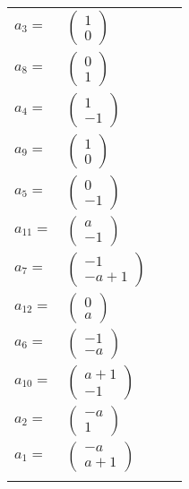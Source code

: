 \documentclass[1p]{elsarticle_modified}
\theoremstyle{definition}
\begin{document}
\begin{tabular}{m{7pt} m{180pt} m{7pt} m{180pt} }
\flushright $a_{3}=$&$\begin{pmatrix}1\\0\end{pmatrix}$ \\
\flushright $a_{8}=$&$\begin{pmatrix}0\\1\end{pmatrix}$ \\
\flushright $a_{4}=$&$\begin{pmatrix}1\\-1\end{pmatrix}$ \\
\flushright $a_{9}=$&$\begin{pmatrix}1\\0\end{pmatrix}$ \\
\flushright $a_{5}=$&$\begin{pmatrix}0\\-1\end{pmatrix}$ \\
\flushright $a_{11}=$&$\begin{pmatrix}a\\-1\end{pmatrix}$ \\
\flushright $a_{7}=$&$\begin{pmatrix}-1\\- a+1\end{pmatrix}$ \\
\flushright $a_{12}=$&$\begin{pmatrix}0\\a\end{pmatrix}$ \\
\flushright $a_{6}=$&$\begin{pmatrix}-1\\- a\end{pmatrix}$ \\
\flushright $a_{10}=$&$\begin{pmatrix}a+1\\-1\end{pmatrix}$ \\
\flushright $a_{2}=$&$\begin{pmatrix}- a\\1\end{pmatrix}$ \\
\flushright $a_{1}=$&$\begin{pmatrix}- a\\a+1\end{pmatrix}$\\&\end{tabular}
\end{document}
